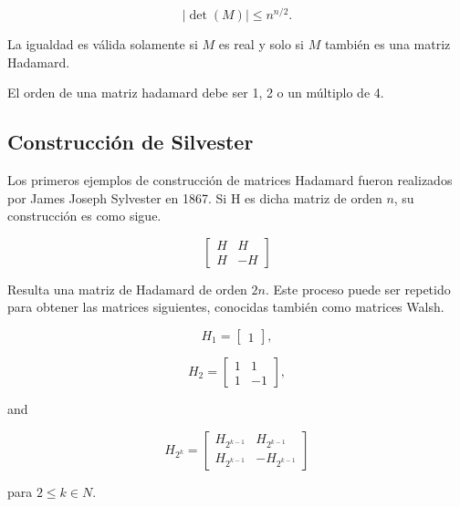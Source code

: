 $$ |\operatorname{det}(M)| \leq n^{n/2}. $$

La igualdad es válida solamente si $M$ es real y solo si $M$ también es una matriz Hadamard.

El orden de una matriz hadamard debe ser 1, 2 o un múltiplo de 4.

\subsection{Construcción de Silvester}

Los primeros ejemplos de construcción de matrices Hadamard fueron realizados por James Joseph Sylvester en 1867. Si H es 
dicha matriz de orden $n$, su construcción es como sigue.

$$ \begin{bmatrix} H & H\\H & -H\end{bmatrix} $$

Resulta una matriz de Hadamard de orden $2n$. Este proceso puede ser repetido para obtener las matrices siguientes, 
conocidas también como matrices Walsh. 

$$ H_1 = \begin{bmatrix} 1 \end{bmatrix}, $$

$$  H_2 = \begin{bmatrix} 1 & 1 \\ 1 & -1 \end{bmatrix}, $$

and

$$ H_{2^k} = \begin{bmatrix} H_{2^{k-1}} & H_{2^{k-1}}\\ H_{2^{k-1}} & -H_{2^{k-1}}\end{bmatrix} $$

para $2 \le k \in N$.
